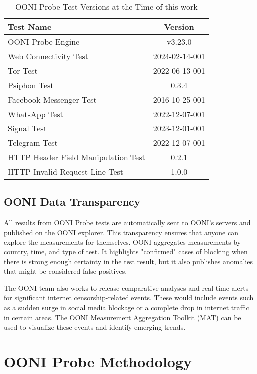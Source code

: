 \begin{table}[H]
\centering
\caption{OONI Probe Test Versions at the Time of this work}
\begin{tabular}{lc}
\toprule
\textbf{Test Name} & \textbf{Version} \\
\midrule
OONI Probe Engine & v3.23.0 \\
Web Connectivity Test    & 2024-02-14-001  \\
Tor Test    & 2022-06-13-001  \\
Psiphon Test    & 0.3.4  \\
Facebook Messenger Test    & 2016-10-25-001  \\
WhatsApp Test    & 2022-12-07-001  \\
Signal Test    & 2023-12-01-001  \\
Telegram Test    & 2022-12-07-001  \\
HTTP Header Field Manipulation Test    & 0.2.1  \\
HTTP Invalid Request Line Test    & 1.0.0  \\
\bottomrule
\end{tabular}
\label{tab:blocked_summary}
\end{table}

\subsection{OONI Data Transparency}

All results from OONI Probe tests are automatically sent to OONI's servers and published on the OONI explorer. This transparency ensures that anyone can explore the measurements for themselves. OONI aggregates measurements by country, time, and type of test. It highlights "confirmed" cases of blocking when there is strong enough certainty in the test result, but it also publishes anomalies that might be considered false positives. 

The OONI team also works to release comparative analyses and real-time alerts for significant internet censorship-related events. These would include events such as a sudden surge in social media blockage or a complete drop in internet traffic in certain areas. The OONI Measurement Aggregation Toolkit (MAT) can be used to visualize these events and identify emerging trends.  

\section{OONI Probe Methodology}

